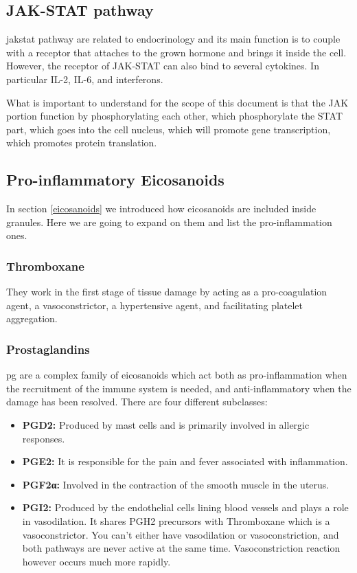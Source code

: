 \subsection{JAK-STAT pathway}
\label{in:JAKSTAT}

\gls{jakstat} pathway are related to endocrinology and its main function is to couple with a receptor that attaches to the grown hormone and brings it inside the cell. However, the receptor of JAK-STAT can also bind to several cytokines. In particular IL-2, IL-6, and interferons.

What is important to understand for the scope of this document is that the JAK portion function by phosphorylating each other, which phosphorylate the STAT part, which goes into the cell nucleus, which will promote gene transcription, which promotes protein translation.

\subsection{Pro-inflammatory Eicosanoids}
\label{arcachonidacidsPRO}

In section \ref{eicosanoids} we introduced how eicosanoids are included inside granules. Here we are going to expand on them and list the pro-inflammation ones.

\subsubsection{Thromboxane}
\label{in:Thromboxane}

They work in the first stage of tissue damage by acting as a pro-coagulation agent, a vasoconstrictor, a hypertensive agent, and facilitating platelet aggregation.

\subsubsection{Prostaglandins}

\gls{pg} are a complex family of eicosanoids which act both as pro-inflammation when the recruitment of the immune system is needed, and anti-inflammatory when the damage has been resolved. There are four different subclasses:

    \begin{itemize}
        \item {\textbf{PGD2:}} Produced by mast cells and is primarily involved in allergic responses.
        \item {\textbf{PGE2:}} It is responsible for the pain and fever associated with inflammation.
        \item {\textbf{PGF2α:}} Involved in the contraction of the smooth muscle in the uterus.
        \item {\textbf{PGI2:}} Produced by the endothelial cells lining blood vessels and plays a role in vasodilation. It shares PGH2 precursors with Thromboxane which is a vasoconstrictor. You can't either have vasodilation or vasoconstriction, and both pathways are never active at the same time. Vasoconstriction reaction however occurs much more rapidly.
    \end{itemize}

